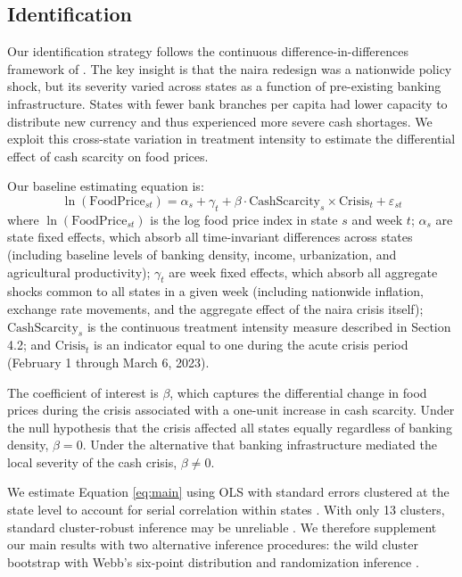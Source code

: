 \documentclass[12pt]{article}
\begin{document}
\subsection{Identification}

Our identification strategy follows the continuous difference-in-differences framework of \citet{chodorow2020cash}. The key insight is that the naira redesign was a nationwide policy shock, but its severity varied across states as a function of pre-existing banking infrastructure. States with fewer bank branches per capita had lower capacity to distribute new currency and thus experienced more severe cash shortages. We exploit this cross-state variation in treatment intensity to estimate the differential effect of cash scarcity on food prices.

Our baseline estimating equation is:
\begin{equation}
\ln(\text{FoodPrice}_{st}) = \alpha_s + \gamma_t + \beta \cdot \text{CashScarcity}_s \times \text{Crisis}_t + \varepsilon_{st}
\label{eq:main}
\end{equation}
where $\ln(\text{FoodPrice}_{st})$ is the log food price index in state $s$ and week $t$; $\alpha_s$ are state fixed effects, which absorb all time-invariant differences across states (including baseline levels of banking density, income, urbanization, and agricultural productivity); $\gamma_t$ are week fixed effects, which absorb all aggregate shocks common to all states in a given week (including nationwide inflation, exchange rate movements, and the aggregate effect of the naira crisis itself); $\text{CashScarcity}_s$ is the continuous treatment intensity measure described in Section 4.2; and $\text{Crisis}_t$ is an indicator equal to one during the acute crisis period (February 1 through March 6, 2023).

The coefficient of interest is $\beta$, which captures the differential change in food prices during the crisis associated with a one-unit increase in cash scarcity. Under the null hypothesis that the crisis affected all states equally regardless of banking density, $\beta = 0$. Under the alternative that banking infrastructure mediated the local severity of the cash crisis, $\beta \neq 0$.

We estimate Equation \ref{eq:main} using OLS with standard errors clustered at the state level to account for serial correlation within states \citep{bertrand2004much}. With only 13 clusters, standard cluster-robust inference may be unreliable \citep{cameron2008bootstrap}. We therefore supplement our main results with two alternative inference procedures: the wild cluster bootstrap with Webb's six-point distribution \citep{webb2022reworking, mackinnon2018wild} and randomization inference \citep{fisher1935design}.
\end{document}
